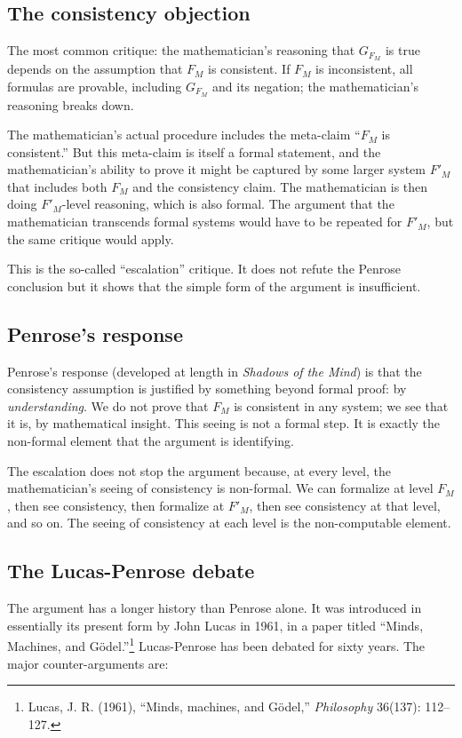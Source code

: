 \subsection{The consistency objection}

The most common critique: the mathematician's reasoning that
$G_{F_M}$ is true depends on the assumption that $F_M$ is
consistent. If $F_M$ is inconsistent, all formulas are provable,
including $G_{F_M}$ and its negation; the mathematician's reasoning
breaks down.

The mathematician's actual procedure includes the meta-claim ``$F_M$
is consistent.'' But this meta-claim is itself a formal statement,
and the mathematician's ability to prove it might be captured by
some larger system $F'_M$ that includes both $F_M$ and the
consistency claim. The mathematician is then doing $F'_M$-level
reasoning, which is also formal. The argument that the mathematician
transcends formal systems would have to be repeated for $F'_M$, but
the same critique would apply.

This is the so-called ``escalation'' critique. It does not refute
the Penrose conclusion but it shows that the simple form of the
argument is insufficient.

\subsection{Penrose's response}

Penrose's response (developed at length in \emph{Shadows of the
Mind}) is that the consistency assumption is justified by something
beyond formal proof: by \emph{understanding}. We do not prove that
$F_M$ is consistent in any system; we see that it is, by
mathematical insight. This seeing is not a formal step. It is
exactly the non-formal element that the argument is identifying.

The escalation does not stop the argument because, at every level,
the mathematician's seeing of consistency is non-formal. We can
formalize at level $F_M$, then see consistency, then formalize at
$F'_M$, then see consistency at that level, and so on. The seeing
of consistency at each level is the non-computable element.

\subsection{The Lucas-Penrose debate}

The argument has a longer history than Penrose alone. It was
introduced in essentially its present form by John Lucas in 1961,
in a paper titled ``Minds, Machines, and G\"odel.''\footnote{Lucas,
J. R. (1961), ``Minds, machines, and G\"odel,'' \emph{Philosophy}
36(137): 112--127.} Lucas-Penrose has been debated for sixty years.
The major counter-arguments are:

